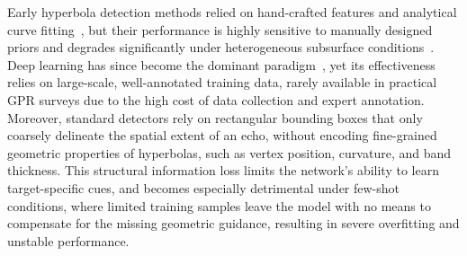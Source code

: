 \documentclass[lettersize,journal]{IEEEtran}
\begin{document}
Early hyperbola detection methods relied on hand-crafted features and analytical
curve fitting~\cite{travassos2021review}, but their performance is highly
sensitive to manually designed priors and degrades significantly under
heterogeneous subsurface conditions~\cite{tong2020survey}. Deep learning has
since become the dominant paradigm~\cite{besaw2015deep,redmon2016yolo}, yet its
effectiveness relies on large-scale, well-annotated training data,  rarely
available in practical GPR surveys due to the high cost of data collection and
expert annotation. Moreover, standard detectors rely on rectangular bounding
boxes that only coarsely delineate the spatial extent of an echo, without
encoding fine-grained geometric properties of hyperbolas, such as vertex
position, curvature, and band thickness. This structural information loss limits
the network's ability to learn target-specific cues, and becomes especially
detrimental under few-shot conditions, where limited training samples leave the
model with no means to compensate for the missing geometric guidance, resulting
in severe overfitting and unstable performance.
\end{document}
